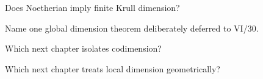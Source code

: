 \begin{exercise}\label{exer:vi29-23}
Does Noetherian imply finite Krull dimension?
\end{exercise}

\begin{exercise}[VI.29.E24: Boundary VI/30]\label{exer:vi29-24}
Name one global dimension theorem deliberately deferred to VI/30.
\end{exercise}

\begin{exercise}[VI.29.E25: Boundary VI/31]\label{exer:vi29-25}
Which next chapter isolates codimension?
\end{exercise}

\begin{exercise}[VI.29.E26: Boundary VI/32]\label{exer:vi29-26}
Which next chapter treats local dimension geometrically?
\end{exercise}
